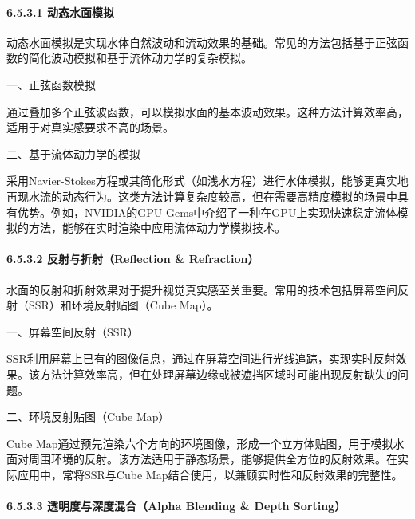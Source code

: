 \hypertarget{ux52a8ux6001ux6c34ux9762ux6a21ux62df}{%
\paragraph{6.5.3.1 动态水面模拟}\label{ux52a8ux6001ux6c34ux9762ux6a21ux62df}}

动态水面模拟是实现水体自然波动和流动效果的基础。常见的方法包括基于正弦函数的简化波动模拟和基于流体动力学的复杂模拟。

一、正弦函数模拟

通过叠加多个正弦波函数，可以模拟水面的基本波动效果。这种方法计算效率高，适用于对真实感要求不高的场景。

二、基于流体动力学的模拟

采用Navier-Stokes方程或其简化形式（如浅水方程）进行水体模拟，能够更真实地再现水流的动态行为。这类方法计算复杂度较高，但在需要高精度模拟的场景中具有优势。例如，NVIDIA的GPU Gems中介绍了一种在GPU上实现快速稳定流体模拟的方法，能够在实时渲染中应用流体动力学模拟技术。

\hypertarget{ux53cdux5c04ux4e0eux6298ux5c04reflection-refraction}{%
\paragraph{6.5.3.2 反射与折射（Reflection \& Refraction）}\label{ux53cdux5c04ux4e0eux6298ux5c04reflection-refraction}}

水面的反射和折射效果对于提升视觉真实感至关重要。常用的技术包括屏幕空间反射（SSR）和环境反射贴图（Cube Map）。

一、屏幕空间反射（SSR）

SSR利用屏幕上已有的图像信息，通过在屏幕空间进行光线追踪，实现实时反射效果。该方法计算效率高，但在处理屏幕边缘或被遮挡区域时可能出现反射缺失的问题。

二、环境反射贴图（Cube Map）

Cube Map通过预先渲染六个方向的环境图像，形成一个立方体贴图，用于模拟水面对周围环境的反射。该方法适用于静态场景，能够提供全方位的反射效果。在实际应用中，常将SSR与Cube Map结合使用，以兼顾实时性和反射效果的完整性。

\hypertarget{ux900fux660eux5ea6ux4e0eux6df1ux5ea6ux6df7ux5408alpha-blending-depth-sorting}{%
\paragraph{6.5.3.3 透明度与深度混合（Alpha Blending \& Depth Sorting）}\label{ux900fux660eux5ea6ux4e0eux6df1ux5ea6ux6df7ux5408alpha-blending-depth-sorting}}

